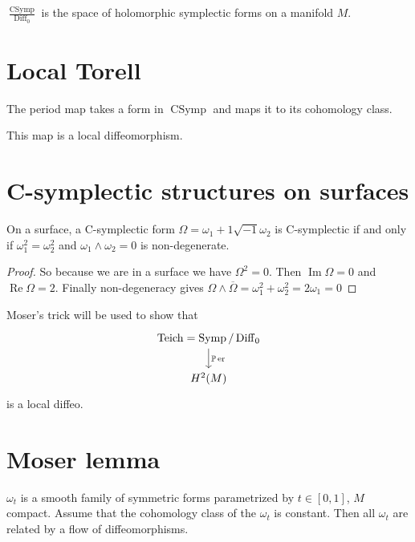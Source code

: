 \begin{defn}\leavevmode
	$\frac{\operatorname{CSymp}}{\operatorname{Diff}_0}$ is the space of holomorphic symplectic forms on a manifold $M$.
\end{defn}

\section{Local Torell}

The period map takes a form in $\operatorname{C S y m p}$ and maps it to its cohomology class.

\begin{thm}\leavevmode
	This map is a local diffeomorphism.
\end{thm}

\section{C-symplectic structures on surfaces}

\begin{claim}\leavevmode
	On a surface, a C-symplectic form $\Omega=\omega_1+1\sqrt{-1}\omega_2$ is C-symplectic if and only if $\omega_1^2=\omega_2^2$ and $\omega_1\wedge \omega_2=0$ is non-degenerate.
\end{claim}

\begin{proof}\leavevmode
	So because we are in a surface we have $\Omega^2=0$. Then $\operatorname{Im}\Omega=0$ and $\operatorname{Re}\Omega=2$. Finally non-degeneracy gives $\Omega\wedge \overline{\Omega}=\omega_1^2+\omega_2^2=2\omega_1=0$
\end{proof}

Moser's trick will be used to show that 
\[\begin{tikzcd}
\operatorname{Teich}=\operatorname{S ym p}/\operatorname{Dif f}_0\arrow[d,"\mathbb{P}\operatorname{er}"]\\
H^{2}(M)
\end{tikzcd}\]
is a local diffeo.

\section{Moser lemma}

\begin{lemma}\leavevmode
	$\omega_t$ is a smooth family of symmetric forms parametrized by $t\in [0,1]$, $M$ compact. Assume that the cohomology class of the $\omega_t$ is constant. Then all $\omega_t$ are related by a flow of diffeomorphisms.
\end{lemma}

